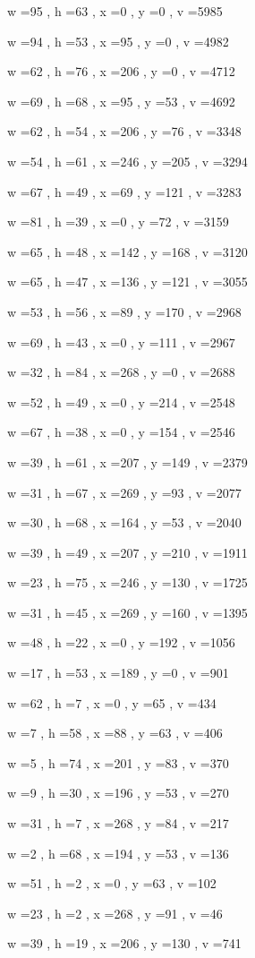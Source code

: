 \documentclass[11pt]{article}
\begin{document}
w =95 , h =63 , x =0 , y =0 , v =5985
\par
w =94 , h =53 , x =95 , y =0 , v =4982
\par
w =62 , h =76 , x =206 , y =0 , v =4712
\par
w =69 , h =68 , x =95 , y =53 , v =4692
\par
w =62 , h =54 , x =206 , y =76 , v =3348
\par
w =54 , h =61 , x =246 , y =205 , v =3294
\par
w =67 , h =49 , x =69 , y =121 , v =3283
\par
w =81 , h =39 , x =0 , y =72 , v =3159
\par
w =65 , h =48 , x =142 , y =168 , v =3120
\par
w =65 , h =47 , x =136 , y =121 , v =3055
\par
w =53 , h =56 , x =89 , y =170 , v =2968
\par
w =69 , h =43 , x =0 , y =111 , v =2967
\par
w =32 , h =84 , x =268 , y =0 , v =2688
\par
w =52 , h =49 , x =0 , y =214 , v =2548
\par
w =67 , h =38 , x =0 , y =154 , v =2546
\par
w =39 , h =61 , x =207 , y =149 , v =2379
\par
w =31 , h =67 , x =269 , y =93 , v =2077
\par
w =30 , h =68 , x =164 , y =53 , v =2040
\par
w =39 , h =49 , x =207 , y =210 , v =1911
\par
w =23 , h =75 , x =246 , y =130 , v =1725
\par
w =31 , h =45 , x =269 , y =160 , v =1395
\par
w =48 , h =22 , x =0 , y =192 , v =1056
\par
w =17 , h =53 , x =189 , y =0 , v =901
\par
w =62 , h =7 , x =0 , y =65 , v =434
\par
w =7 , h =58 , x =88 , y =63 , v =406
\par
w =5 , h =74 , x =201 , y =83 , v =370
\par
w =9 , h =30 , x =196 , y =53 , v =270
\par
w =31 , h =7 , x =268 , y =84 , v =217
\par
w =2 , h =68 , x =194 , y =53 , v =136
\par
w =51 , h =2 , x =0 , y =63 , v =102
\par
w =23 , h =2 , x =268 , y =91 , v =46
\par
w =39 , h =19 , x =206 , y =130 , v =741
\par
\newpage
\end{document}
